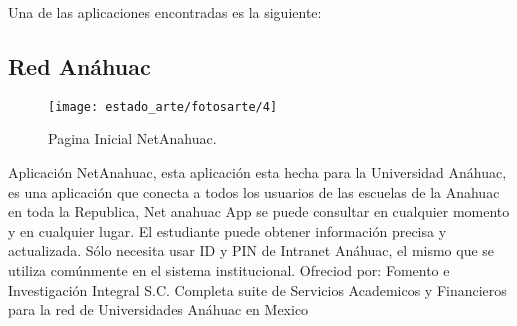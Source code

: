 Una de las aplicaciones encontradas es la siguiente:
\pagebreak
\subsection{Red Anáhuac}

\begin{figure}[htbp!]
	\centering
		\texttt{[image: estado\_arte/fotosarte/4]}
	\caption{Pagina Inicial NetAnahuac.}
\end{figure}

Aplicación NetAnahuac, esta aplicación esta hecha para la Universidad Anáhuac, es una aplicación que conecta a todos los usuarios de las escuelas de la Anahuac en toda la Republica,
Net anahuac App se puede consultar en cualquier momento y en cualquier lugar.
El estudiante puede obtener información precisa y actualizada.
Sólo necesita usar ID y PIN de Intranet Anáhuac, el mismo que se utiliza comúnmente en el sistema institucional.
Ofreciod por: Fomento e Investigación Integral S.C.
Completa suite de Servicios Academicos y Financieros para la red de Universidades Anáhuac en Mexico



